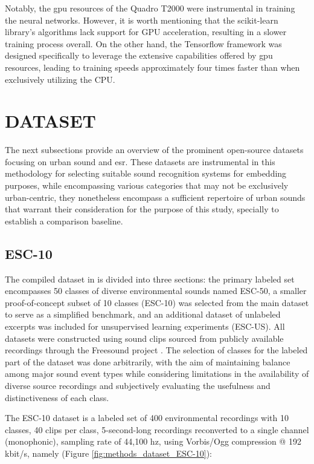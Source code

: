 Notably, the \gls{gpu} resources of the Quadro T2000 were instrumental in training the neural networks. However, it is worth mentioning that the scikit-learn library's algorithms lack support for GPU acceleration, resulting in a slower training process overall. On the other hand, the Tensorflow framework was designed specifically to leverage the extensive capabilities offered by \gls{gpu} resources, leading to training speeds approximately four times faster than when exclusively utilizing the CPU.


\section{DATASET}
\label{sec:methods_dataset}

The next subsections provide an overview of the prominent open-source datasets focusing on urban sound and \gls{esr}. These datasets are instrumental in this methodology for selecting suitable sound recognition systems for embedding purposes, while encompassing various categories that may not be exclusively urban-centric, they nonetheless encompass a sufficient repertoire of urban sounds that warrant their consideration for the purpose of this study, specially to establish a comparison baseline.

\subsection{ESC-10}
\label{subsec:dataset_ESC-10}

The compiled dataset in \textcite{PiczakESC2015} is divided into three sections: the primary labeled set encompasses 50 classes of diverse environmental sounds named ESC-50, a smaller proof-of-concept subset of 10 classes (ESC-10) was selected from the main dataset to serve as a simplified benchmark, and an additional dataset of unlabeled excerpts was included for unsupervised learning experiments (ESC-US). All datasets were constructed using sound clips sourced from publicly available recordings through the Freesound project \cite{Font_freesound2013}. The selection of classes for the labeled part of the dataset was done arbitrarily, with the aim of maintaining balance among major sound event types while considering limitations in the availability of diverse source recordings and subjectively evaluating the usefulness and distinctiveness of each class.

The ESC-10 dataset is a labeled set of 400 environmental recordings with 10 classes, 40 clips per class, 5-second-long recordings reconverted to a single channel (monophonic), sampling rate of 44,100 \gls{hz},  using Vorbis/Ogg compression @ 192 \gls{k}bit/\gls{s}, namely (Figure \ref{fig:methods_dataset_ESC-10}):

